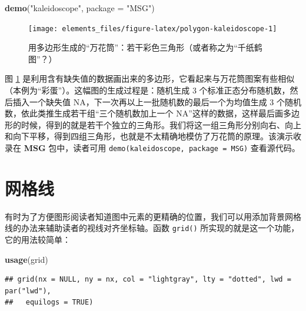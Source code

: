 \documentclass[
  b5paper,
  UTF8,twoside]{book}
\newenvironment{Shaded}{\begin{snugshade}}{\end{snugshade}}
\newcommand{\AttributeTok}[1]{\textcolor[rgb]{0.13,0.29,0.53}{#1}}
\newcommand{\FunctionTok}[1]{\textcolor[rgb]{0.13,0.29,0.53}{\textbf{#1}}}
\newcommand{\NormalTok}[1]{#1}
\newcommand{\StringTok}[1]{\textcolor[rgb]{0.31,0.60,0.02}{#1}}
\begin{document}
\begin{Shaded}
\begin{Highlighting}[]
\FunctionTok{demo}\NormalTok{(}\StringTok{"kaleidoscope"}\NormalTok{, }\AttributeTok{package =} \StringTok{"MSG"}\NormalTok{)}
\end{Highlighting}
\end{Shaded}

\begin{figure}

{\centering \texttt{[image: elements\_files/figure-latex/polygon-kaleidoscope-1]} 

}

\caption[ 用多边形生成的“万花筒”]{用多边形生成的``万花筒''：若干彩色三角形（或者称之为``千纸鹤图''？）}\label{fig:polygon-kaleidoscope}
\end{figure}



图 \ref{fig:polygon-kaleidoscope} 是利用含有缺失值的数据画出来的多边形，它看起来与万花筒图案有些相似（本例为``彩蛋''）。这幅图的生成过程是：随机生成 3 个标准正态分布随机数，然后插入一个缺失值 NA，下一次再以上一批随机数的最后一个为均值生成 3 个随机数，依此类推生成若干组``三个随机数加上一个 NA''这样的数据，这样最后画多边形的时候，得到的就是若干个独立的三角形。我们将这一组三角形分别向右、向上和向下平移，得到四组三角形，也就是不太精确地模仿了万花筒的原理。该演示收录在 \textbf{MSG} 包中，读者可用 \texttt{demo(\textquotesingle{}kaleidoscope\textquotesingle{},\ package\ =\ \textquotesingle{}MSG\textquotesingle{})} 查看源代码。

\section{网格线}\label{sec:grid}

有时为了方便图形阅读者知道图中元素的更精确的位置，我们可以用添加背景网格线的办法来辅助读者的视线对齐坐标轴。函数 \texttt{grid()} 所实现的就是这一个功能，它的用法较简单：

\begin{Shaded}
\begin{Highlighting}[]
\FunctionTok{usage}\NormalTok{(grid)}
\end{Highlighting}
\end{Shaded}

\begin{verbatim}
## grid(nx = NULL, ny = nx, col = "lightgray", lty = "dotted", lwd = par("lwd"),
##   equilogs = TRUE)
\end{verbatim}
\end{document}

